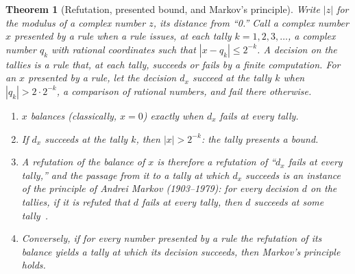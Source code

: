 \documentclass[11pt]{article}
\newtheorem{theorem}{Theorem}[section]
\theoremstyle{definition}
\theoremstyle{remark}
\begin{document}
\begin{theorem}[Refutation, presented bound, and Markov's principle]\label{thm:markov}
Write $|z|$ for the modulus of a complex number $z$, its distance from ``0.'' Call a complex number $x$ \emph{presented by a rule} when a rule issues, at each tally $k=1,2,3,\dots$, a complex number $q_k$ with rational coordinates such that $|x-q_k|\le 2^{-k}$. A \emph{decision} on the tallies is a rule that, at each tally, succeeds or fails by a finite computation. For an $x$ presented by a rule, let the decision $d_x$ succeed at the tally $k$ when $|q_k|>2\cdot2^{-k}$, a comparison of rational numbers, and fail there otherwise.
\begin{enumerate}[leftmargin=2em,itemsep=1pt]
\item $x$ balances (classically, $x=0$) exactly when $d_x$ fails at every tally.
\item If $d_x$ succeeds at the tally $k$, then $|x|>2^{-k}$: the tally presents a bound.
\item A refutation of the balance of $x$ is therefore a refutation of ``$d_x$ fails at every tally,'' and the passage from it to a tally at which $d_x$ succeeds is an instance of the principle of Andrei Markov (1903--1979): for every decision $d$ on the tallies, if it is refuted that $d$ fails at every tally, then $d$ succeeds at some tally~\citep{markov}.
\item Conversely, if for every number presented by a rule the refutation of its balance yields a tally at which its decision succeeds, then Markov's principle holds.
\end{enumerate}
\end{theorem}
\end{document}
